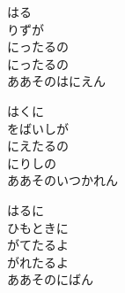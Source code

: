 \documentclass[10pt,b5j]{tarticle} %
\begin{document}
\vspace{1.5em} %
\newcommand{\linespace}{0.5em} %
\newcommand{\blocksize}{0.5\hsize} %
\begin{enumerate} %
    \begin{minipage}[c]{\blocksize}
    
        \vspace{\linespace}
        \item
        はる\\
        りずが\\
        にったるの\\
        にったるの\\
        ああそのはにえん
        
        \vspace{\linespace}
        \item
        はくに\\
        をばいしが\\
        にえたるの\\
        にりしの\\
        ああそのいつかれん
        
        \vspace{\linespace}
        \item
        はるに\\
        ひもときに\\
        がてたるよ\\
        がれたるよ\\
        ああそのにばん
    
    \end{minipage}
\end{enumerate} %
\end{document}
